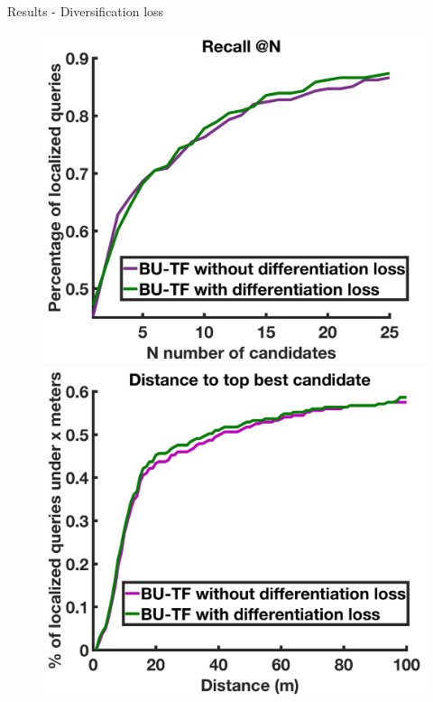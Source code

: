 \begin{frame}{Results - Diversification loss}
	\begin{figure}[t]
		\centering
		\includegraphics[width=0.499\linewidth]{images/diffloss_res/recall.jpg}\hfill
		\includegraphics[width=0.499\linewidth]{images/diffloss_res/dist.jpg}
	\end{figure}	
\end{frame}

